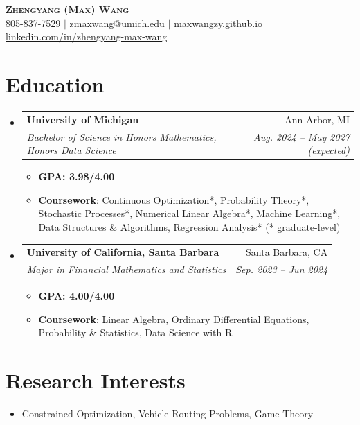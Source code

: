 \documentclass[letterpaper,11pt]{article}
\makeatletter
\newcommand{\resumeItem}[1]{
  \item\small{
    {#1 \vspace{-2pt}}
  }
}
\newcommand{\resumeSubheading}[4]{
  \vspace{-2pt}\item
    \begin{tabular*}{0.97\textwidth}[t]{l@{\extracolsep{\fill}}r}
      \textbf{#1} & #2 \\
      \textit{\small#3} & \textit{\small #4} \\
    \end{tabular*}\vspace{-7pt}
}
\newcommand{\resumeSubHeadingListStart}{\begin{itemize}[leftmargin=0.15in, label={}]}
\newcommand{\resumeSubHeadingListEnd}{\end{itemize}}
\newcommand{\resumeItemListStart}{\begin{itemize}}
\newcommand{\resumeItemListEnd}{\end{itemize}\vspace{-5pt}}
\makeatother
\begin{document}

\begin{center}
    \textbf{\Huge \scshape Zhengyang (Max) Wang} \\ \vspace{1pt}
    \small 805-837-7529 
    $|$ 
    \href{mailto:zmaxwang@umich.edu}{zmaxwang@umich.edu} 
    $|$
    \href{https://maxwangzy.github.io/}{maxwangzy.github.io}
    $|$ 
    \href{https://linkedin.com/in/zhengyang-max-wang}{linkedin.com/in/zhengyang-max-wang} 
\end{center}


\section{Education}
    \resumeSubHeadingListStart
        \resumeSubheading
            {University of Michigan}{Ann Arbor, MI}
            {Bachelor of Science in Honors Mathematics, Honors Data Science}{Aug. 2024 -- May 2027 (expected)}
            \resumeItemListStart
                \resumeItem{\textbf{GPA: 3.98/4.00}}
                \resumeItem{\textbf{Coursework}: Continuous Optimization*, Probability Theory*, Stochastic Processes*, Numerical Linear Algebra*, Machine Learning*, Data Structures \& Algorithms, Regression Analysis* (* graduate-level)}
            \resumeItemListEnd

        \resumeSubheading
            {University of California, Santa Barbara}{Santa Barbara, CA}
            {Major in Financial Mathematics and Statistics}{Sep. 2023 -- Jun 2024}
            \resumeItemListStart
                \resumeItem{\textbf{GPA: 4.00/4.00}}
                \resumeItem{\textbf{Coursework}: Linear Algebra, Ordinary Differential Equations, Probability \& Statistics, Data Science with R}
            \resumeItemListEnd
  \resumeSubHeadingListEnd

\section{Research Interests}
    \resumeSubHeadingListStart
      \item \small Constrained Optimization, Vehicle Routing Problems, Game Theory
    \resumeSubHeadingListEnd
\end{document}
